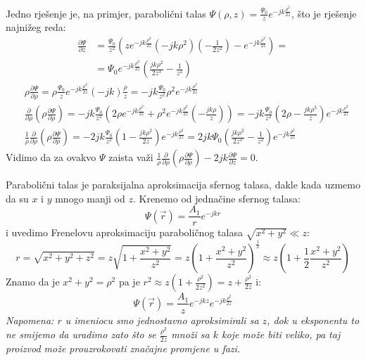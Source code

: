 \documentclass[fleqn]{report}
\begin{document}
Jedno rješenje je, na primjer, parabolični talas $\Psi(\rho, z) = \frac{\Psi_0}{z}e^{-jk\frac{\rho^2}{2z}}$, što je rješenje najnižeg reda:
\begin{align*}
    \frac{\partial\Psi}{\partial z} & = \frac{\Psi_0}{z^2}\left(ze^{-jk\frac{\rho^2}{2z}}(-jk\rho^2)(-\frac{1}{2z^2}) - e^{-jk\frac{\rho^2}{2z}}\right) = \\
                                    & = \Psi_0e^{-jk\frac{\rho^2}{2z}}\left(\frac{jk\rho^2}{2z^3} - \frac{1}{z^2}\right)
\end{align*}
\begin{align*}
     & \rho\frac{\partial\Psi}{\partial\rho} = \rho\frac{\Psi_0}{z}e^{-jk\frac{\rho^2}{2z}}(-jk)\frac{\rho}{z} = -jk\frac{\Psi_0}{z^2}\rho^2e^{-jk\frac{\rho^2}{2z}}                                                                                                                                 \\
     & \frac{\partial}{\partial\rho}\left(\rho\frac{\partial\Psi}{\partial\rho}\right) = -jk\frac{\Psi_0}{z^2}\left(2\rho e^{-jk\frac{\rho^2}{2z}} + \rho^2e^{-jk\frac{\rho^2}{2z}}(-\frac{jk\rho}{z})\right) = -jk\frac{\Psi_0}{z^2}\left(2\rho - \frac{jk\rho^3}{z}\right)e^{-jk\frac{\rho^2}{2z}} \\
     & \frac{1}{\rho}\frac{\partial}{\partial\rho}\left(\rho\frac{\partial\Psi}{\partial\rho}\right) = -2jk\frac{\Psi_0}{z^2} \left(1 - \frac{jk\rho^2}{2z}\right)e^{-jk\frac{\rho^2}{2z}} = 2jk\Psi_0\left(\frac{jk\rho^2}{2z^3} - \frac{1}{z^2} \right)e^{-jk\frac{\rho^2}{2z}}
\end{align*}
Vidimo da za ovakvo $\Psi$ zaista važi $\frac{1}{\rho}\frac{\partial}{\partial\rho}\left(\rho\frac{\partial\Psi}{\partial\rho}\right) - 2jk\frac{\partial\Psi}{\partial z} = 0$.
\begin{tbox}
    Parabolični talas je paraksijalna aproksimacija sfernog talasa, dakle kada uzmemo da su $x$ i $y$ mnogo manji od $z$.
    Krenemo od jednačine sfernog talasa:
    \begin{equation*}
        \Psi(\vec r) = \frac{A_1}{r} e^{-jkr}
    \end{equation*}
    i uvedimo Frenelovu aproksimaciju paraboličnog talasa $\sqrt{x^2 + y^2} \ll z$:
    \begin{equation*}
        r = \sqrt{x^2 + y^2 + z^2} = z\sqrt{1 + \frac{x^2 + y^2}{z^2}} = z\left(1 + \frac{x^2 + y^2}{z^2}\right)^{\frac{1}{2}} \approx z \left(1 + \frac{1}{2}\frac{x^2 + y^2}{z^2}\right)
    \end{equation*}
    Znamo da je $x^2 + y^2 = \rho^2$ pa je $r^2 \approx z(1 + \frac{\rho^2}{2z^2}) = z + \frac{\rho^2}{2z}$ i:
    \begin{equation*}
        \Psi(\vec r) = \frac{A_1}{z} e^{-jkz} e^{-jk\frac{\rho^2}{2z}}
    \end{equation*}
    \emph{Napomena: $r$ u imeniocu smo jednostavno aproksimirali sa $z$, dok u eksponentu to ne smijemo da uradimo zato što se $\frac{\rho^2}{2z}$ množi sa $k$ koje može biti veliko, pa taj proizvod može prouzrokovati značajne promjene u fazi.}
\end{tbox}
\end{document}
